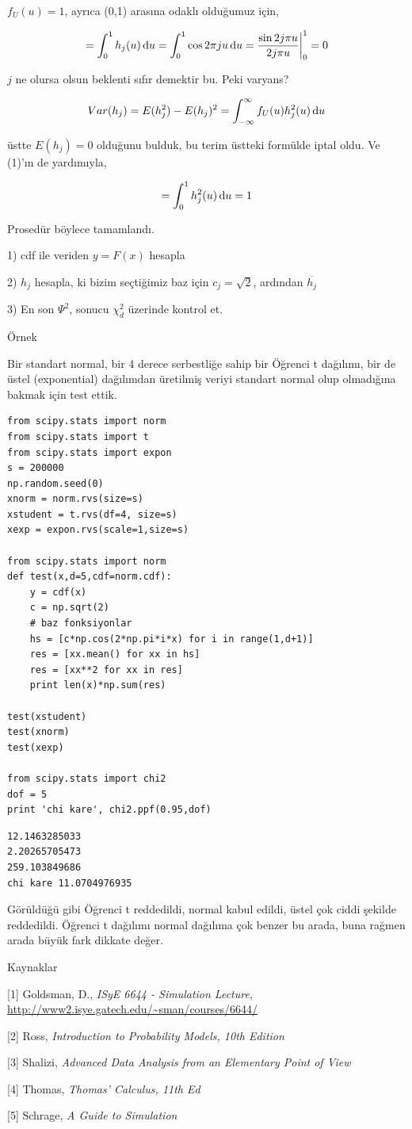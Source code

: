 \documentclass[12pt,fleqn]{article}\usepackage{../../common}
\begin{document}
$f_U(u) = 1$, ayrıca (0,1) arasına odaklı olduğumuz için,

$$
= \int_{0}^{1} h_j(u) \,\mathrm{d} u = \int_{0}^{1} \cos 2\pi j u \,\mathrm{d} u
= \frac{\sin 2j\pi u }{2j\pi u} \bigg|_{0}^{1} = 0
$$

$j$ ne olursa olsun beklenti sıfır demektir bu. Peki varyans? 

$$
Var(h_j) = E(h_j^2)-E(h_j)^2 = \int_{-\infty}^{\infty} f_U(u)h_j^2(u) \,\mathrm{d} u
$$

üstte $E(h_j)=0$ olduğunu bulduk, bu terim üstteki formülde iptal oldu. Ve
(1)'ın de yardımıyla,

$$  = \int_{0}^{1}  h_j^2(u) \,\mathrm{d} u = 1$$

Prosedür böylece tamamlandı. 

1) cdf ile veriden $y=F(x)$ hesapla

2) $h_j$ hesapla, ki bizim seçtiğimiz baz için $c_j = \sqrt{2}$, ardından $\overline{h_j}$

3) En son $\Psi^2$, sonucu $\chi^2_d$ üzerinde kontrol et. 

Örnek

Bir standart normal, bir 4 derece serbestliğe sahip bir Öğrenci t dağılımı,
bir de üstel (exponential) dağılımdan üretilmiş veriyi standart normal olup
olmadığına bakmak için test ettik. 

\begin{verbatim}
from scipy.stats import norm
from scipy.stats import t
from scipy.stats import expon
s = 200000
np.random.seed(0)
xnorm = norm.rvs(size=s)
xstudent = t.rvs(df=4, size=s)
xexp = expon.rvs(scale=1,size=s)

from scipy.stats import norm
def test(x,d=5,cdf=norm.cdf):
    y = cdf(x)
    c = np.sqrt(2)
    # baz fonksiyonlar
    hs = [c*np.cos(2*np.pi*i*x) for i in range(1,d+1)]
    res = [xx.mean() for xx in hs]
    res = [xx**2 for xx in res]
    print len(x)*np.sum(res)

test(xstudent)
test(xnorm)
test(xexp)

from scipy.stats import chi2
dof = 5
print 'chi kare', chi2.ppf(0.95,dof)
\end{verbatim}

\begin{verbatim}
12.1463285033
2.20265705473
259.103849686
chi kare 11.0704976935
\end{verbatim}

Görüldüğü gibi Öğrenci t reddedildi, normal kabul edildi, üstel çok ciddi
şekilde reddedildi. Öğrenci t dağılımı normal dağılıma çok benzer bu arada,
buna rağmen arada büyük fark dikkate değer.

Kaynaklar

[1] Goldsman, D., {\em ISyE 6644 - Simulation Lecture}, \url{http://www2.isye.gatech.edu/~sman/courses/6644/}

[2] Ross, {\em Introduction to Probability Models, 10th Edition}

[3] Shalizi, {\em Advanced Data Analysis from an Elementary Point of View}

[4] Thomas, {\em Thomas' Calculus, 11th Ed}

[5] Schrage, {\em A Guide to Simulation}
\end{document}
